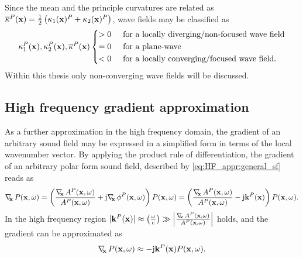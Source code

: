 Since the mean and the principle curvatures are related as $\overline{\kappa}^P(\mathbf{x})  = \frac{1}{2} \left( \kappa_1(\mathbf{x})^P+\kappa_2(\mathbf{x})^P \right)$, wave fields may be classified as
\begin{equation}
\label{eq:HF_appr:curvature_cases}
\kappa_1^P(\vx),\kappa_2^P(\vx),\overline{\kappa}^P(\vx) 
\begin{cases*}
> 0  \hspace{5mm} \text{for a locally diverging/non-focused wave field} \\
= 0  \hspace{5mm} \text{for a plane-wave}  \\
< 0  \hspace{5mm} \text{for a locally converging/focused wave field.} 
\end{cases*}
\end{equation}
Within this thesis only non-converging wave fields will be discussed.

\subsection{High frequency gradient approximation}
As a further approximation in the high frequency domain, the gradient of an arbitrary sound field may be expressed in a simplified form in terms of the local wavenumber vector.
By applying the product rule of differentiation, the gradient of an arbitrary polar form sound field, described by \eqref{eq:HF_appr:general_sf} reads as
\begin{equation}
\Dx P(\vx,\omega) = \left(  \frac{\Dx A^P(\vx,\omega)}{A^P(\vx,\omega)} + \ti \Dx \phi^P(\vx,\omega) \right) P(\vx,\omega) =  \left(  \frac{\Dx A^P(\vx,\omega)}{A^P(\vx,\omega)} - \ti \vk^P(\vx) \right) P(\vx,\omega).
\end{equation}
In the high frequency region $|\mathbf{k}^P(\mathbf{x})| \approx \left( \frac{\omega}{c} \right) \gg \left| \frac{ \nabla_{\!\!\mathbf{x}}\, A^P(\mathbf{x},\omega)}{A^P(\mathbf{x},\omega)} \right|$ holds, and the gradient can be approximated as
\begin{equation}
\nabla_{\!\!\mathbf{x}}\, P(\mathbf{x},\omega) \approx - \mathrm{j} \mathbf{k}^P(\mathbf{x}) P(\mathbf{x},\omega).
\label{eq:HF_approx:gradient_appr}
\end{equation}

